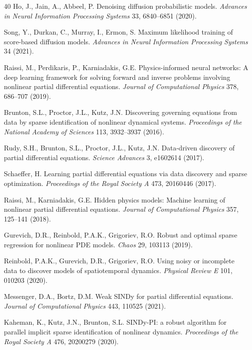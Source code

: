 \documentclass[preprint,12pt]{elsarticle}
\begin{document}
\begin{thebibliography}{40}
Ho, J., Jain, A., Abbeel, P. 
Denoising diffusion probabilistic models. 
\textit{Advances in Neural Information Processing Systems} 33, 6840--6851 (2020).

Song, Y., Durkan, C., Murray, I., Ermon, S. 
Maximum likelihood training of score-based diffusion models. 
\textit{Advances in Neural Information Processing Systems} 34 (2021).

Raissi, M., Perdikaris, P., Karniadakis, G.E. 
Physics-informed neural networks: A deep learning framework for solving forward and inverse problems involving nonlinear partial differential equations. 
\textit{Journal of Computational Physics} 378, 686--707 (2019).

Brunton, S.L., Proctor, J.L., Kutz, J.N. 
Discovering governing equations from data by sparse identification of nonlinear dynamical systems. 
\textit{Proceedings of the National Academy of Sciences} 113, 3932--3937 (2016).

Rudy, S.H., Brunton, S.L., Proctor, J.L., Kutz, J.N. 
Data-driven discovery of partial differential equations. 
\textit{Science Advances} 3, e1602614 (2017).

Schaeffer, H. 
Learning partial differential equations via data discovery and sparse optimization. 
\textit{Proceedings of the Royal Society A} 473, 20160446 (2017).

Raissi, M., Karniadakis, G.E. 
Hidden physics models: Machine learning of nonlinear partial differential equations. 
\textit{Journal of Computational Physics} 357, 125--141 (2018).

Gurevich, D.R., Reinbold, P.A.K., Grigoriev, R.O. 
Robust and optimal sparse regression for nonlinear PDE models. 
\textit{Chaos} 29, 103113 (2019).

Reinbold, P.A.K., Gurevich, D.R., Grigoriev, R.O. 
Using noisy or incomplete data to discover models of spatiotemporal dynamics. 
\textit{Physical Review E} 101, 010203 (2020).

Messenger, D.A., Bortz, D.M. 
Weak SINDy for partial differential equations. 
\textit{Journal of Computational Physics} 443, 110525 (2021).

Kaheman, K., Kutz, J.N., Brunton, S.L. 
SINDy-PI: a robust algorithm for parallel implicit sparse identification of nonlinear dynamics. 
\textit{Proceedings of the Royal Society A} 476, 20200279 (2020).


\end{thebibliography}
\end{document}
